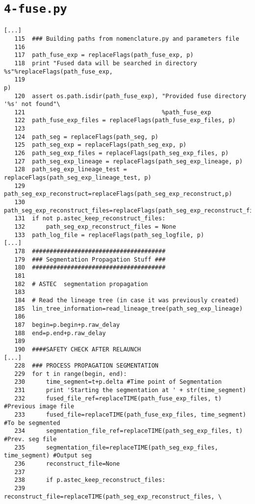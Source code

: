\documentclass{article}
\begin{document}
\pagebreak
\section{\texttt{4-fuse.py}}

\begin{verbatim}
[...]
   115	### Building paths from nomenclature.py and parameters file
   116	
   117	path_fuse_exp = replaceFlags(path_fuse_exp, p)
   118	print "Fused data will be searched in directory %s"%replaceFlags(path_fuse_exp,
   119	                                                                 p)
   120	assert os.path.isdir(path_fuse_exp), "Provided fuse directory '%s' not found"\
   121	                                     %path_fuse_exp
   122	path_fuse_exp_files = replaceFlags(path_fuse_exp_files, p)
   123	
   124	path_seg = replaceFlags(path_seg, p)
   125	path_seg_exp = replaceFlags(path_seg_exp, p)
   126	path_seg_exp_files = replaceFlags(path_seg_exp_files, p)
   127	path_seg_exp_lineage = replaceFlags(path_seg_exp_lineage, p)
   128	path_seg_exp_lineage_test = replaceFlags(path_seg_exp_lineage_test, p)
   129	path_seg_exp_reconstruct=replaceFlags(path_seg_exp_reconstruct,p)
   130	path_seg_exp_reconstruct_files=replaceFlags(path_seg_exp_reconstruct_files,p)
   131	if not p.astec_keep_reconstruct_files:
   132	    path_seg_exp_reconstruct_files = None
   133	path_log_file = replaceFlags(path_seg_logfile, p)
[...]
   178	######################################
   179	### Segmentation Propagation Stuff ###
   180	######################################
   181	
   182	# ASTEC  segmentation propagation
   183	
   184	# Read the lineage tree (in case it was previously created)
   185	lin_tree_information=read_lineage_tree(path_seg_exp_lineage) 
   186	
   187	begin=p.begin+p.raw_delay
   188	end=p.end+p.raw_delay
   189	
   190	####SAFETY CHECK AFTER RELAUNCH
[...]
   228	### PROCESS PROPAGATION SEGMENTATION 
   229	for t in range(begin, end):
   230	    time_segment=t+p.delta #Time point of Segmentation 
   231	    print 'Starting the segmentation at ' + str(time_segment)
   232	    fused_file_ref=replaceTIME(path_fuse_exp_files, t) #Previous image file
   233	    fused_file=replaceTIME(path_fuse_exp_files, time_segment) #To be segmented
   234	    segmentation_file_ref=replaceTIME(path_seg_exp_files, t) #Prev. seg file
   235	    segmentation_file=replaceTIME(path_seg_exp_files, time_segment) #Output seg
   236	    reconstruct_file=None
   237	
   238	    if p.astec_keep_reconstruct_files:
   239	        reconstruct_file=replaceTIME(path_seg_exp_reconstruct_files, \

\end{verbatim}
\end{document}
